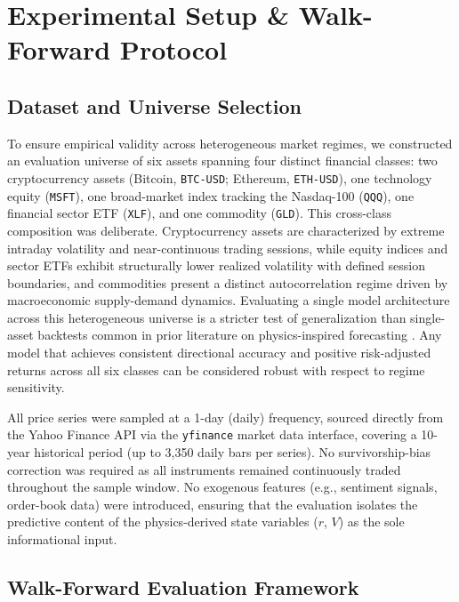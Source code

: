 \documentclass[11pt,a4paper]{article}
\begin{document}
\section{Experimental Setup \& Walk-Forward Protocol}
\label{sec:experiments}

\subsection{Dataset and Universe Selection}

To ensure empirical validity across heterogeneous market regimes, we constructed an evaluation universe of six assets spanning four distinct financial classes: two cryptocurrency assets (Bitcoin, \texttt{BTC-USD}; Ethereum, \texttt{ETH-USD}), one technology equity (\texttt{MSFT}), one broad-market index tracking the Nasdaq-100 (\texttt{QQQ}), one financial sector ETF (\texttt{XLF}), and one commodity (\texttt{GLD}). This cross-class composition was deliberate. Cryptocurrency assets are characterized by extreme intraday volatility and near-continuous trading sessions, while equity indices and sector ETFs exhibit structurally lower realized volatility with defined session boundaries, and commodities present a distinct autocorrelation regime driven by macroeconomic supply-demand dynamics. Evaluating a single model architecture across this heterogeneous universe is a stricter test of generalization than single-asset backtests common in prior literature on physics-inspired forecasting \cite{brunton2016discovering, champion2019data}. Any model that achieves consistent directional accuracy and positive risk-adjusted returns across all six classes can be considered robust with respect to regime sensitivity.

All price series were sampled at a 1-day (daily) frequency, sourced directly from the Yahoo Finance API via the \texttt{yfinance} market data interface, covering a 10-year historical period (up to 3,350 daily bars per series). No survivorship-bias correction was required as all instruments remained continuously traded throughout the sample window. No exogenous features (e.g., sentiment signals, order-book data) were introduced, ensuring that the evaluation isolates the predictive content of the physics-derived state variables ($r$, $V$) as the sole informational input.

\subsection{Walk-Forward Evaluation Framework}
\label{sec:cbe_protocol}
\end{document}
